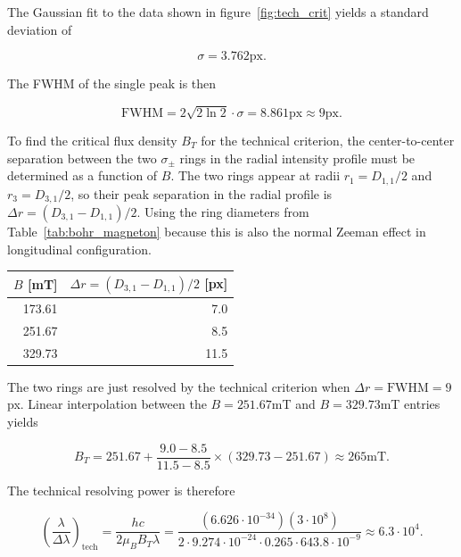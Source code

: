 \documentclass{article}
\begin{document}
The Gaussian fit to the data shown in figure~\ref{fig:tech_crit} yields a standard deviation of

\begin{equation}
    \sigma = 3.762\mathrm{px}.
\end{equation}

The FWHM of the single peak is then

\begin{equation}
    \mathrm{FWHM} = 2\sqrt{2\ln 2}\cdot\sigma = 8.861\mathrm{px} \approx 9\mathrm{px}.
\end{equation}

To find the critical flux density $B_T$ for the technical criterion, the center-to-center separation between the two $\sigma_\pm$ rings in the radial intensity profile must be determined as a function of $B$. The two rings appear at radii $r_{1} = D_{1,1}/2$ and $r_{3} = D_{3,1}/2$, so their peak separation in the radial profile is $\Delta r = (D_{3,1} - D_{1,1})/2$. Using the ring diameters from Table~\ref{tab:bohr_magneton} because this is also the normal Zeeman effect in longitudinal configuration.

\begin{center}
\begin{tabular}{rr}
\toprule
$B$ [mT] & $\Delta r = (D_{3,1}-D_{1,1})/2$ [px] \\
\midrule
173.61 & 7.0 \\
251.67 & 8.5 \\
329.73 & 11.5 \\
\bottomrule
\end{tabular}
\end{center}

The two rings are just resolved by the technical criterion when $\Delta r = \mathrm{FWHM} = 9$px. Linear interpolation between the $B = 251.67$mT and $B = 329.73$mT entries yields

\begin{equation}
    B_T = 251.67 + \frac{9.0 - 8.5}{11.5 - 8.5}\times(329.73 - 251.67) \approx 265\mathrm{mT}.
\end{equation}

The technical resolving power is therefore

\begin{equation}
    \left(\frac{\lambda}{\Delta\lambda}\right)_\mathrm{tech} = \frac{hc}{2\mu_B B_T\lambda} = \frac{(6.626\cdot10^{-34})(3\cdot10^{8})}{2\cdot9.274\cdot10^{-24}\cdot0.265\cdot643.8\cdot10^{-9}} \approx 6.3\cdot 10^4.
\end{equation}
\end{document}
